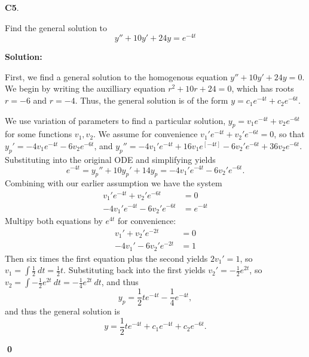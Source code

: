 \documentclass{article}
\newenvironment{problem}[1]
{
  \begin{flushleft}
  \textbf{#1}.
  \ignorespaces
}
{
  \end{flushleft}
}
\newenvironment{solution}
{
  \ignorespaces
  \textbf{Solution:}
}
{
  \ignorespacesafterend
  \begin{flushright}
  {\bfseries \qed}
  \end{flushright}
}
\begin{document}
\begin{problem}{C5}
Find the general solution to \[y'' + 10y' + 24y = e^{-4t} 
\]
\end{problem}
\begin{solution}
First, we find a general solution to the homogenous equation \(y''+10y'+24y=0\).  We begin by writing the auxilliary equation \(r^2+10r+24=0\), which has roots \(r=-6\) and \(r=-4\).  Thus, the general solution is of the form \(y=c_1e^{-4t}+c_2e^{-6t}\). 

We use variation of parameters to find a particular solution, \(y_p=v_1e^{-4t}+v_2e^{-6t}\) for some functions \(v_1, v_2\).  We assume for convenience \(v_1'e^{-4t}+v_2'e^{-6t}=0\), so that \(y_p ' = -4v_1e^{-4t} - 6v_2 e^{-6t}\), and \(y_p '' = -4v_1' e^{-4t}+16v_1e^[-4t] -6v_2'e^{-6t}+36v_2e^{-6t}\).  Substituting into the original ODE and simplifying yields
\[e^{-4t}=y_p''+10y_p'+14y_p = -4v_1'e^{-4t}-6v_2'e^{-6t}.\]
Combining with our earlier assumption we have the system
\begin{align*}
v_1'e^{-4t}+v_2'e^{-6t}&=0 \\
-4v_1'e^{-4t}-6v_2'e^{-6t} &= e^{-4t}
\end{align*}
Multipy both equations by \(e^{4t}\) for convenience:
\begin{align*}
v_1'+v_2'e^{-2t}&=0 \\
-4v_1'-6v_2'e^{-2t} &= 1
\end{align*}
Then six times the first equation plus the second yields \(2v_1'=1\), so \(v_1=\int \frac{1}{2}\ dt = \frac{1}{2} t\).  Substituting back into the first yields \(v_2'=-\frac{1}{2}e^{2t}\), so \(v_2 = \int -\frac{1}{2}e^{2t}\ dt = -\frac{1}{4} e^{2t}\ dt\), and thus \[y_p = \frac{1}{2}t e^{-4t} -\frac{1}{4}e^{-4t},\]
and thus the general solution is 
\[ y = \frac{1}{2}te^{-4t} + c_1 e^{-4t} + c_2 e^{-6t}.\]

\end{solution}
\end{document}
